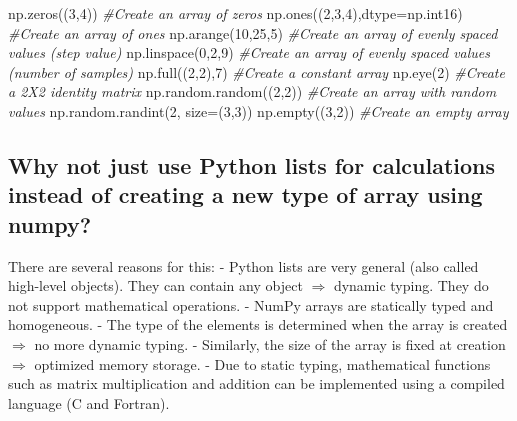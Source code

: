 \documentclass[11pt]{article}
\newenvironment{Shaded}{}{}
\newcommand{\DecValTok}[1]{\textcolor[rgb]{0.25,0.63,0.44}{{#1}}}
\newcommand{\CommentTok}[1]{\textcolor[rgb]{0.38,0.63,0.69}{\textit{{#1}}}}
\newcommand{\NormalTok}[1]{{#1}}
\newcommand{\OperatorTok}[1]{\textcolor[rgb]{0.40,0.40,0.40}{{#1}}}
\begin{document}
\begin{Shaded}
\begin{Highlighting}[]
\NormalTok{np.zeros((}\DecValTok{3}\NormalTok{,}\DecValTok{4}\NormalTok{)) }\CommentTok{\#Create an array of zeros}
\NormalTok{np.ones((}\DecValTok{2}\NormalTok{,}\DecValTok{3}\NormalTok{,}\DecValTok{4}\NormalTok{),dtype}\OperatorTok{=}\NormalTok{np.int16) }\CommentTok{\#Create an array of ones}
\NormalTok{np.arange(}\DecValTok{10}\NormalTok{,}\DecValTok{25}\NormalTok{,}\DecValTok{5}\NormalTok{) }\CommentTok{\#Create an array of evenly spaced values (step value)}
\NormalTok{np.linspace(}\DecValTok{0}\NormalTok{,}\DecValTok{2}\NormalTok{,}\DecValTok{9}\NormalTok{) }\CommentTok{\#Create an array of evenly spaced values (number of samples)}
\NormalTok{np.full((}\DecValTok{2}\NormalTok{,}\DecValTok{2}\NormalTok{),}\DecValTok{7}\NormalTok{) }\CommentTok{\#Create a constant array}
\NormalTok{np.eye(}\DecValTok{2}\NormalTok{) }\CommentTok{\#Create a 2X2 identity matrix}
\NormalTok{np.random.random((}\DecValTok{2}\NormalTok{,}\DecValTok{2}\NormalTok{)) }\CommentTok{\#Create an array with random values}
\NormalTok{np.random.randint(}\DecValTok{2}\NormalTok{, size}\OperatorTok{=}\NormalTok{(}\DecValTok{3}\NormalTok{,}\DecValTok{3}\NormalTok{))}
\NormalTok{np.empty((}\DecValTok{3}\NormalTok{,}\DecValTok{2}\NormalTok{)) }\CommentTok{\#Create an empty array}
\end{Highlighting}
\end{Shaded}

\hypertarget{why-not-just-use-python-lists-for-calculations-instead-of-creating-a-new-type-of-array-using-numpy}{%
\subsection{Why not just use Python lists for calculations instead of
creating a new type of array using
numpy?}\label{why-not-just-use-python-lists-for-calculations-instead-of-creating-a-new-type-of-array-using-numpy}}

There are several reasons for this: - Python lists are very general
(also called high-level objects). They can contain any object
\(\Rightarrow\) dynamic typing. They do not support mathematical
operations. - NumPy arrays are statically typed and homogeneous. - The
type of the elements is determined when the array is created
\(\Rightarrow\) no more dynamic typing. - Similarly, the size of the
array is fixed at creation \(\Rightarrow\) optimized memory storage. -
Due to static typing, mathematical functions such as matrix
multiplication and addition can be implemented using a compiled language
(C and Fortran).
\end{document}
